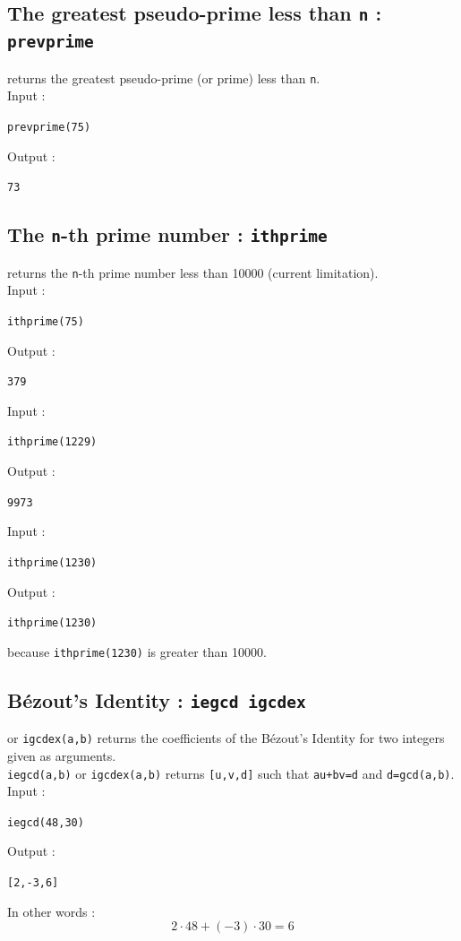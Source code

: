 \documentclass[a4paper,11pt]{book}
\begin{document}
\subsection{The greatest pseudo-prime less than {\tt n} : {\tt prevprime}}
 returns the greatest pseudo-prime (or prime) less 
than {\tt n}.\\
Input :
\begin{center}{\tt prevprime(75)}\end{center}
Output :
\begin{center}{\tt 73}\end{center}

\subsection{The {\tt n}-th prime number : {\tt ithprime}}
 returns the {\tt n}-th  prime number 
less than 10000 (current limitation).\\
Input :
\begin{center}{\tt ithprime(75)}\end{center}
Output :
\begin{center}{\tt 379}\end{center}
Input :
\begin{center}{\tt ithprime(1229)}\end{center}
Output :
\begin{center}{\tt 9973}\end{center}
Input :
\begin{center}{\tt ithprime(1230)}\end{center}
Output :
\begin{center}{\tt ithprime(1230)}\end{center}
because {\tt ithprime(1230)} is greater than 10000.

\subsection{B\'ezout's Identity : {\tt iegcd igcdex}}
 or  {\tt igcdex(a,b)} 
returns the coefficients of the B\'ezout's Identity for two integers given
as arguments.\\
{\tt iegcd(a,b)}  or  {\tt igcdex(a,b)} returns {\tt [u,v,d]}  such that 
{\tt au+bv=d} and {\tt d=gcd(a,b)}.\\
Input :
\begin{center}{\tt iegcd(48,30) }\end{center}
Output :
\begin{center}{\tt [2,-3,6]}\end{center}
In other words :
$$2 \cdot 48+ (-3) \cdot 30 =6$$
\end{document}
